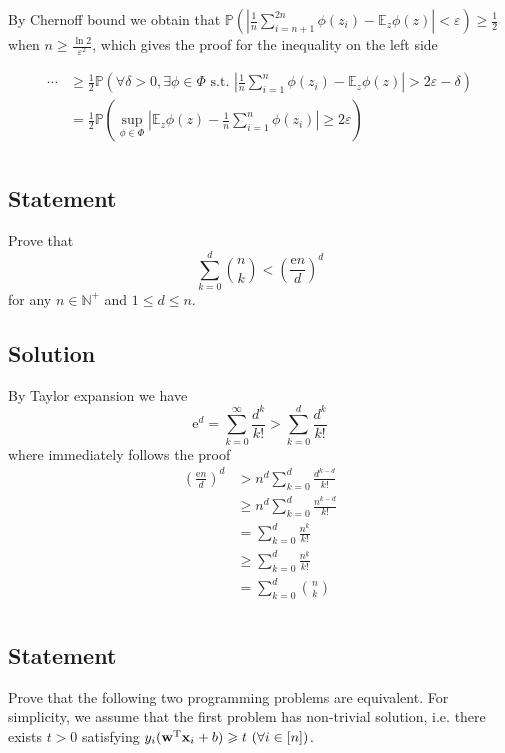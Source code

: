 \documentclass[8pt]{article}
\theoremstyle{compact}
\def\le{\leqslant}
\def\ge{\geqslant}
\def\P#1{\mathbb{P}\left({#1}\right)}
\def\e{\mathrm{e}}
\begin{document}
By Chernoff bound we obtain that $\P{\left|\frac1n\sum\limits_{i=n+1}^{2n}\phi(z_i) - \mathbb E_z\phi(z)\right| < \varepsilon} \ge \frac12$ when $n \ge \frac{\ln 2}{\varepsilon^2}$, which gives the proof for the inequality on the left side

\begin{equation}
	\begin{split}
		\cdots &\ge \frac12 \P{\forall \delta > 0, \exists \phi \in \Phi \text{ s.t. } \left|\frac1n\sum_{i=1}^{n}\phi(z_i) - \mathbb E_z\phi(z)\right| > 2\varepsilon - \delta }\\
		&= \frac12 \P{\sup_{\phi \in \Phi}\left|\mathbb E_z{\phi(z)} - \frac1n\sum_{i=1}^{n}\phi(z_i)\right| \ge 2\varepsilon} 
	\end{split}
\end{equation}


\section{}
\subsection*{Statement}
Prove that $$\sum_{k=0}^d\binom{n}{k} < \left(\frac{\e n}{d}\right)^d$$ for any $n \in \mathbb N^+$ and $1 \le d \le n$.
\subsection*{Solution}
By Taylor expansion we have $$\e^d = \sum_{k = 0}^{\infty}\frac{d^k}{k!} > \sum_{k=0}^d\frac{d^k}{k!}$$ where immediately follows the proof 
\begin{equation}
	\begin{split}
		\left(\frac{\e n}{d}\right)^d &> n^d\sum_{k=0}^{d}\frac{d^{k-d}}{k!}\\
		&\ge n^d\sum_{k=0}^{d}\frac{n^{k-d}}{k!}\\
		&= \sum_{k=0}^{d}\frac{n^k}{k!}\\
		&\ge \sum_{k=0}^{d}\frac{n^{\underline k}}{k!}\\
		&= \sum_{k=0}^d\binom nk
	\end{split}
\end{equation}

\section{}
\subsection*{Statement}
Prove that the following two programming problems are equivalent. For simplicity, we assume that the first problem has non-trivial solution, i.e. there exists $t > 0$ satisfying $y_i(\mathbf w^{\text T}\mathbf x_i + b) \ge t \ (\forall i \in [n])$.\\
\end{document}
